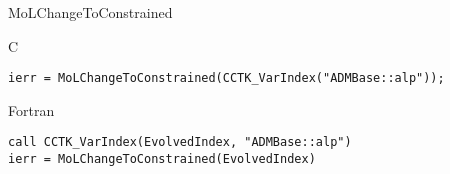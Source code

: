 \begin{FunctionDescription}{MoLChangeToConstrained}
  \begin{ExampleSection}
    \begin{Example}{C}
\begin{verbatim}
ierr = MoLChangeToConstrained(CCTK_VarIndex("ADMBase::alp"));
\end{verbatim}
    \end{Example}
    \begin{Example}{Fortran}
\begin{verbatim}
call CCTK_VarIndex(EvolvedIndex, "ADMBase::alp")
ierr = MoLChangeToConstrained(EvolvedIndex)
\end{verbatim}
    \end{Example}
  \end{ExampleSection}

\end{FunctionDescription}



